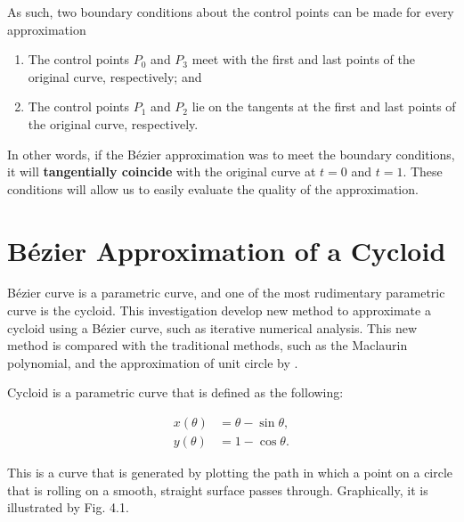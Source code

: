 \documentclass[11pt, oneside, appendixprefix=Appendix]{article}
\theoremstyle{definition}
\numberwithin{figure}{section}
\begin{document}
As such, two boundary conditions about the control points can be made for every approximation

\begin{enumerate}
\item The control points $P_0$ and $P_3$ meet with the first and last points of the original curve, respectively; and
\item The control points $P_1$ and $P_2$ lie on the tangents at the first and last points of the original curve, respectively.
\end{enumerate}

In other words, if the B\'ezier approximation was to meet the boundary conditions, it will \textbf{tangentially coincide} with the original curve at $t=0$ and $t=1$. These conditions will allow us to easily evaluate the quality of the approximation.

\section{B\'ezier Approximation of a Cycloid}

B\'ezier curve is a parametric curve, and one of the most rudimentary parametric curve is the cycloid. This investigation develop new method to approximate a cycloid using a B\'ezier curve, such as iterative numerical analysis. This new method is compared with the traditional methods, such as the Maclaurin polynomial, and the approximation of unit circle by .



Cycloid is a parametric curve that is defined as the following:

\begin{equation}
\begin{split}
x(\theta) & = \theta - \sin \theta, \\
y(\theta) & = 1 - \cos \theta.
\end{split}
\end{equation}

This is a curve that is generated by plotting the path in which a point on a circle that is rolling on a smooth, straight surface passes through. Graphically, it is illustrated by Fig. 4.1.
\end{document}
